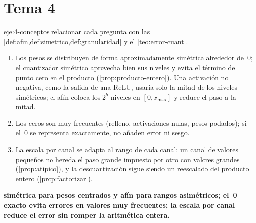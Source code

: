 \section{Tema 4}

\begin{solucion}{eje:4-conceptos}
\planteamiento relacionar cada pregunta con las \cref{def:afin,def:simetrico,def:granularidad} y el \cref{teo:error-cuant}.
\pasos
\begin{enumerate}[label=(\alph*)]
  \item Los pesos se distribuyen de forma aproximadamente simétrica alrededor de~0; el cuantizador simétrico aprovecha bien sus niveles y evita el término de punto cero en el producto (\cref{prop:producto-entero}). Una activación no negativa, como la salida de una ReLU, usaría solo la mitad de los niveles simétricos; el afín coloca los $2^{b}$ niveles en $[0,x_{\max}]$ y reduce el paso a la mitad.
  \item Los ceros son muy frecuentes (relleno, activaciones nulas, pesos podados); si el~0 se representa exactamente, no añaden error ni sesgo.
  \item La escala por canal se adapta al rango de cada canal: un canal de valores pequeños no hereda el paso grande impuesto por otro con valores grandes (\cref{prop:atipico}), y la descuantización sigue siendo un reescalado del producto entero (\cref{prop:factorizar}).
\end{enumerate}
\resultado \textbf{simétrica para pesos centrados y afín para rangos asimétricos; el~0 exacto evita errores en valores muy frecuentes; la escala por canal reduce el error sin romper la aritmética entera.}
\end{solucion}

